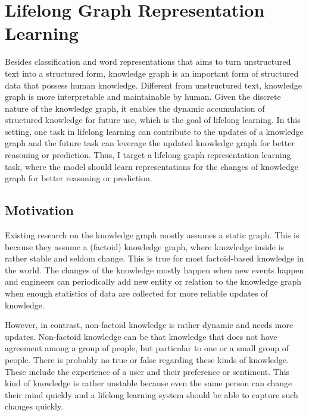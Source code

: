 \chapter{Lifelong Graph Representation Learning}
\label{chap5:graph}

Besides classification and word representations that aims to turn unstructured text into a structured form, knowledge graph is an important form of structured data that possess human knowledge.
Different from unstructured text, knowledge graph is more interpretable and maintainable by human.
Given the discrete nature of the knowledge graph, it enables the dynamic accumulation of structured knowledge for future use, which is the goal of lifelong learning.
In this setting, one task in lifelong learning can contribute to the updates of a knowledge graph and the future task can leverage the updated knowledge graph for better reasoning or prediction.
Thus, I target a lifelong graph representation learning task, where the model should learn representations for the changes of knowledge graph for better reasoning or prediction.

\section{Motivation}

Existing research on the knowledge graph mostly assumes a static graph.
This is because they assume a (factoid) knowledge graph, where knowledge inside is rather stable and seldom change.
This is true for most factoid-based knowledge in the world.
The changes of the knowledge mostly happen when new events happen and engineers can periodically add new entity or relation to the knowledge graph when enough statistics of data are collected for more reliable updates of knowledge.

However, in contrast, non-factoid knowledge is rather dynamic and needs more updates.
Non-factoid knowledge can be that knowledge that does not have agreement among a group of people, but particular to one or a small group of people.
There is probably no true or false regarding these kinds of knowledge.
These include the experience of a user and their preference or sentiment.
This kind of knowledge is rather unstable because even the same person can change their mind quickly and a lifelong learning system should be able to capture such changes quickly.

